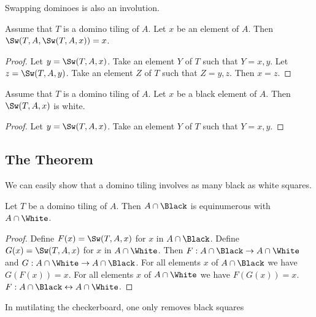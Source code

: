 Swapping dominoes is also an involution.

\begin{forthel}
    \begin{lemma}
        Assume that $T$ is a domino tiling of $A$. Let $x$ be an element of $A$.
        Then $\Sw(T,A,\Sw(T,A,x)) = x$.
    \end{lemma}
    \begin{proof}
        Let $y = \Sw(T,A,x)$.
        Take an element $Y$ of $T$ such that $Y = {x,y}$.
        Let $z = \Sw(T,A,y)$.
        Take an element $Z$ of $T$ such that $Z = {y,z}$.
        Then $x = z$.
    \end{proof}

    \begin{lemma}
        Assume that $T$ is a domino tiling of $A$.
        Let $x$ be a black element of $A$.
        Then $\Sw(T,A,x)$ is white.
    \end{lemma}
    \begin{proof}
        Let $y = \Sw(T,A,x)$.
        Take an element $Y$ of $T$ such that $Y = {x,y}$.
    \end{proof}
\end{forthel}

\subsection{The Theorem}

\noindent We can easily show that a domino tiling involves as many black as white squares.

\begin{forthel}
    \begin{lemma}
        Let $T$ be a domino tiling of $A$. Then $A \cap \Black$ is
        equinumerous with $A \cap \White$.
    \end{lemma}
    \begin{proof}
        Define $F(x) = \Sw(T,A,x)$ for $x$ in $A \cap \Black$.
        Define $G(x) = \Sw(T,A,x)$ for $x$ in $A \cap \White$.
        Then $F: A \cap \Black \to A \cap \White$ and
        $G: A \cap \White \to A \cap \Black$.
        For all elements $x$ of $A \cap \Black$ we have $G(F(x))=x$.
        For all elements $x$ of $A \cap \White$ we have $F(G(x))=x$.
        $F : A \cap \Black \leftrightarrow A \cap \White$.
    \end{proof}
\end{forthel}

\noindent In mutilating the checkerboard, one only removes black squares


